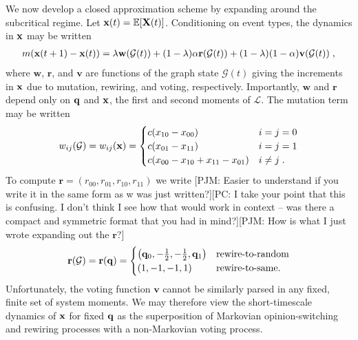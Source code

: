 \documentclass[review, onefignum, onetabnum]{siamart171218}
\newcommand{\pjm}[1]{{\color{blue}[PJM: #1]}}
\newcommand{\pc}[1]{{\color{comment_purple}[PC: #1]}}
\begin{document}
    	We now develop a closed approximation scheme by expanding around the subcritical regime. 
    	Let $\mathbf{x}(t) = \mathbb{E}[\mathbf{X}(t)]$. 
    	Conditioning on event types, the dynamics in $\mathbf{x}$ may be written
    	\begin{align}
    		m(\x(t+1) - \x(t)) = \lambda \mathbf{w}(\mathcal{G}(t)) + (1-\lambda)\alpha \mathbf{r}(\mathcal{G}(t)) + (1-\lambda)(1-\alpha) \mathbf{v}(\mathcal{G}(t))\;, \label{eq:dynamics}
    	\end{align}
    	where $\mathbf{w}$, $\mathbf{r}$, and $\mathbf{v}$ are functions of the graph state $\mathcal{G}(t)$ giving the increments in $\mathbf{x}$ due to mutation, rewiring, and voting, respectively. 
    	Importantly, $\mathbf{w}$ and $\mathbf{r}$ depend only on $\mathbf{q}$ and $\mathbf{x}$, the first and second moments of $\mathcal{L}$. 
    	The mutation term may be written 
    	\begin{align*}
    		w_{ij}(\mathcal{G}) = w_{ij}(\mathbf{x}) = 
    		\begin{cases}
    			c(x_{10} - x_{00}) &  i = j = 0 \\ 
    			c (x_{01}-x_{11}) & i = j = 1 \\ 
    			c (x_{00}  - x_{10}+x_{11}-x_{01}) & i \neq j\;.
    		\end{cases}
    	\end{align*}
    	To compute $\mathbf{r}=(r_{00}, r_{01}, r_{10}, r_{11})$ we write \pjm{Easier to understand if you write it in the same form as w was just written?}\pc{I take your point that this is confusing. I don't think I see how that would work in context -- was there a compact and symmetric format that you had in mind?}\pjm{How is what I just wrote expanding out the $\mathbf{r}$?}
    	\begin{align*}
    		\mathbf{r}(\mathcal{G}) = \mathbf{r}(\mathbf{q}) = 
    		\begin{cases}
    			\left(\mathbf{q}_0, -\frac{1}{2}, -\frac{1}{2}, \mathbf{q}_1\right) & \text{rewire-to-random}\\
    			\left(1, -1, -1, 1\right) & \text{rewire-to-same}.
    		\end{cases}
    	\end{align*}
    	Unfortunately, the voting function $\mathbf{v}$ cannot be similarly parsed in any fixed, finite set of system moments.  
    	We may therefore view the short-timescale dynamics of $\mathbf{x}$ for fixed $\mathbf{q}$ as the superposition of Markovian opinion-switching and rewiring processes with a non-Markovian voting process. 
	
\end{document}

